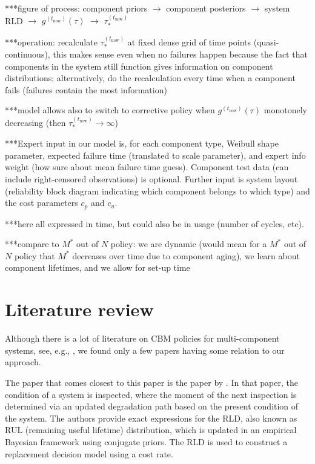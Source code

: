 \documentclass[authoryear]{elsarticle}
\def\tnow{t_\text{now}}
\newcommand{\gnow}{g^{(\tnow)}}
\newcommand{\tausnow}{\tau_*^{(\tnow)}}
\begin{document}
***figure of process: component priors $\to$ component posteriors $\to$ system RLD $\to$ $\gnow(\tau)$ $\to$ $\tausnow$

***operation: recalculate $\tausnow$ at fixed dense grid of time points (quasi-continuous),
this makes sense even when no failures happen because the fact that components in the system still function
gives information on component distributions;
alternatively, do the recalculation every time when a component fails (failures contain the most information)

***model allows also to switch to corrective policy when $\gnow(\tau)$ monotonely decreasing (then $\tausnow \to \infty$)

***Expert input in our model is, for each component type,
Weibull shape parameter, expected failure time (translated to scale parameter),
and expert info weight (how sure about mean failure time guess).
Component test data (can include right-censored observations) is optional.
Further input is system layout (reliability block diagram indicating which component belongs to which type)
and the cost parameters $c_p$ and $c_u$.

***here all expressed in time, but could also be in usage (number of cycles, etc).

***compare to $M^*$ out of $N$ policy:
we are dynamic (would mean for a $M^*$ out of $N$ policy that $M^*$ decreases over time due to component aging),
we learn about component lifetimes,
and we allow for set-up time
\fi

\section{Literature review}
\label{sec:literature}

Although there is a lot of literature on CBM policies for multi-component systems,
see, e.g., \citet{2016:oldekeizer},
we found only a few papers having some relation to our approach.

The paper that comes closest to this paper is the paper by \citet{2013:si-et-al}.
In that paper, the condition of a system is inspected,
where the moment of the next inspection is determined via an updated degradation path based on the present condition of the system.
The authors provide exact expressions for the RLD,
also known as RUL (remaining useful lifetime) distribution,
which is updated in an empirical Bayesian framework using conjugate priors.
The RLD is used to construct a replacement decision model using a cost rate.
\end{document}
